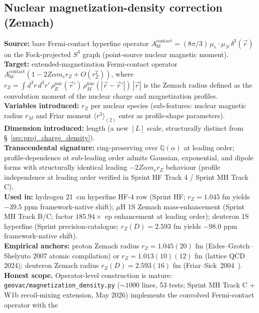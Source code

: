 \documentclass[11pt]{article}
\begin{document}
\subsection{Nuclear magnetization-density correction (Zemach)}
\label{sec:proj_magnetization_density}
\textbf{Source:} bare Fermi-contact hyperfine operator
$A_\text{hf}^\text{contact} = (8\pi/3)\,\mu_e \cdot \mu_N\,\delta^3(\vec{r})$
on the Fock-projected $S^3$ graph (point-source nuclear magnetic
moment).\\
\textbf{Target:} extended-magnetization Fermi-contact operator
$A_\text{hf}^\text{contact}(1 - 2 Z\alpha m_e r_Z + O(r_Z^2))$,
where $r_Z = \int d^3r\, d^3r'\,\rho_E^\text{nuc}(\vec{r}')\,
\rho_M^\text{nuc}(|\vec{r}-\vec{r}'|)\,|\vec{r}|$ is the Zemach
radius defined as the convolution moment of the nuclear charge and
magnetization profiles.\\
\textbf{Variables introduced:} $r_Z$ per nuclear species
(sub-features: nuclear magnetic radius $r_M$ and Friar moment
$\langle r^3\rangle_{(2)}$ enter as profile-shape parameters).\\
\textbf{Dimension introduced:} length (a new $[L]$ scale,
structurally distinct from \S~\ref{sec:proj_charge_density}).\\
\textbf{Transcendental signature:} ring-preserving over
$\mathbb{Q}(\alpha)$ at leading order; profile-dependence at
sub-leading order admits Gaussian, exponential, and dipole forms
with structurally identical leading $-2 Z\alpha m_e r_Z$ behaviour
(profile independence at leading order verified in Sprint HF
Track 4 / Sprint MH Track C).\\
\textbf{Used in:} hydrogen 21~cm hyperfine HF-4 row (Sprint HF;
$r_Z = 1.045$ fm yields $-39.5$ ppm framework-native shift); $\mu$H
1S Zemach mass-enhancement (Sprint MH Track B/C; factor $185.94
\times$ ep enhancement at leading order); deuteron 1S hyperfine
(Sprint precision-catalogue; $r_Z(D) = 2.593$ fm yields $-98.0$ ppm
framework-native shift).\\
\textbf{Empirical anchors:} proton Zemach radius
$r_Z = 1.045(20)$ fm (Eides--Grotch--Shelyuto 2007 atomic compilation) or $r_Z =
1.013(10)(12)$ fm (lattice QCD 2024); deuteron Zemach radius
$r_Z(D) = 2.593(16)$ fm (Friar--Sick~2004~\cite{friar_sick2004}).\\
\textbf{Honest scope.}  Operator-level construction is mature:
\texttt{geovac/magnetization\_density.py} ($\sim 1000$ lines, 53
tests; Sprint MH Track C + W1b recoil-mixing extension, May 2026)
implements the convolved Fermi-contact operator with the
\end{document}
